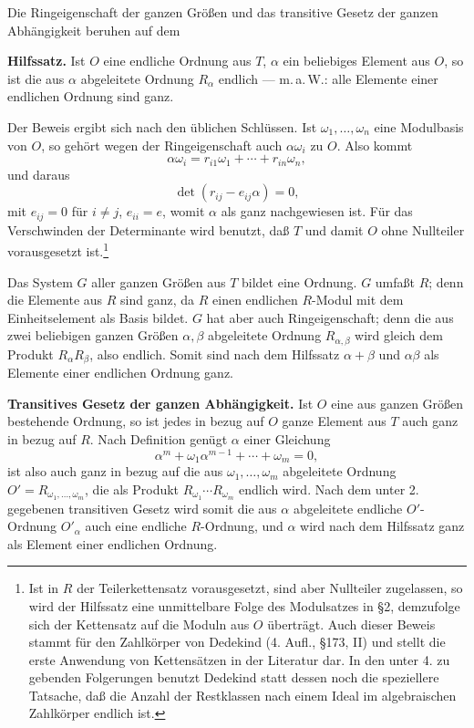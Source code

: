 \documentclass[11pt]{article}
\begin{document}
Die Ringeigenschaft der ganzen Größen und das transitive Gesetz der ganzen
Abhängigkeit beruhen auf dem

\medskip
\noindent\textbf{Hilfssatz.} Ist $O$ eine endliche Ordnung aus $T$, $\alpha$ ein
beliebiges Element aus $O$, so ist die aus $\alpha$ abgeleitete Ordnung $R_\alpha$
endlich — m.\,a.\,W.: alle Elemente einer endlichen Ordnung sind ganz.

Der Beweis ergibt sich nach den üblichen Schlüssen. Ist $\omega_1,\ldots,\omega_n$
eine Modulbasis von $O$, so gehört wegen der Ringeigenschaft auch
$\alpha\omega_i$ zu $O$. Also kommt
\[
        \alpha\omega_i=r_{i1}\omega_1+\cdots+r_{in}\omega_n,
\]
und daraus
\[
        \det(r_{ij}-e_{ij}\alpha)=0,
\]
mit $e_{ij}=0$ für $i\ne j$, $e_{ii}=e$, womit $\alpha$ als ganz nachgewiesen ist.
Für das Verschwinden der Determinante wird benutzt, daß $T$ und damit $O$ ohne
Nullteiler vorausgesetzt ist.\footnote{Ist in $R$ der Teilerkettensatz vorausgesetzt,
sind aber Nullteiler zugelassen, so wird der Hilfssatz eine unmittelbare Folge des
Modulsatzes in §2, demzufolge sich der Kettensatz auf die Moduln aus $O$
überträgt. Auch dieser Beweis stammt für den Zahlkörper von Dedekind
(4. Aufl., §173, II) und stellt die erste Anwendung von Kettensätzen in der
Literatur dar. In den unter 4. zu gebenden Folgerungen benutzt Dedekind statt
dessen noch die speziellere Tatsache, daß die Anzahl der Restklassen nach einem
Ideal im algebraischen Zahlkörper endlich ist.}

Das System $G$ aller ganzen Größen aus $T$ bildet eine Ordnung. $G$ umfaßt
$R$; denn die Elemente aus $R$ sind ganz, da $R$ einen endlichen $R$-Modul mit
dem Einheitselement als Basis bildet. $G$ hat aber auch Ringeigenschaft; denn die
aus zwei beliebigen ganzen Größen $\alpha,\beta$ abgeleitete Ordnung $R_{\alpha,\beta}$
wird gleich dem Produkt $R_\alpha R_\beta$, also endlich. Somit sind nach dem
Hilfssatz $\alpha+\beta$ und $\alpha\beta$ als Elemente einer endlichen Ordnung ganz.

\medskip
\noindent\textbf{Transitives Gesetz der ganzen Abhängigkeit.} Ist $O$ eine aus
ganzen Größen bestehende Ordnung, so ist jedes in bezug auf $O$ ganze Element
aus $T$ auch ganz in bezug auf $R$. Nach Definition genügt $\alpha$ einer Gleichung
\[
        \alpha^m+\omega_1\alpha^{m-1}+\cdots+\omega_m=0,
\]
ist also auch ganz in bezug auf die aus $\omega_1,\ldots,\omega_m$ abgeleitete
Ordnung $O'=R_{\omega_1,\ldots,\omega_m}$, die als Produkt
$R_{\omega_1}\cdots R_{\omega_m}$ endlich wird. Nach dem unter 2. gegebenen
transitiven Gesetz wird somit die aus $\alpha$ abgeleitete endliche $O'$-Ordnung
$O'_\alpha$ auch eine endliche $R$-Ordnung, und $\alpha$ wird nach dem Hilfssatz
ganz als Element einer endlichen Ordnung.
\end{document}
